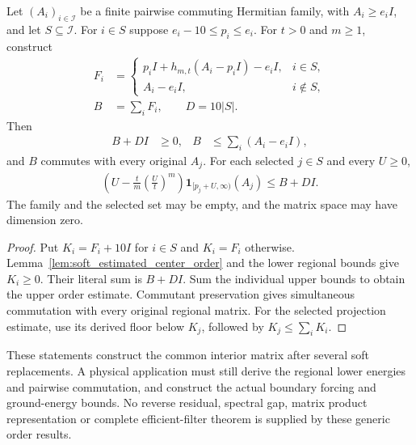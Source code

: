 \begin{lemma}
    \label{lem:soft_commuting_family_order}
    \leanok
    Let $(A_i)_{i\in\mathcal I}$ be a finite pairwise commuting
    Hermitian family, with $A_i\geq e_iI$, and let
    $S\subseteq\mathcal I$. For $i\in S$ suppose
    $e_i-10\leq p_i\leq e_i$. For $t>0$ and $m\geq1$, construct
    \begin{align}
        F_i & =
        \begin{cases}
            p_iI+h_{m,t}(A_i-p_iI)-e_iI, & i\in S,    \\
            A_i-e_iI,                    & i\notin S,
        \end{cases} \\
        B   & =\sum_i F_i,\qquad D=10|S|.
    \end{align}
    Then
    \begin{align}
        B+DI & \geq0, & B & \leq\sum_i(A_i-e_iI),
    \end{align}
    and $B$ commutes with every original $A_j$. For each selected
    $j\in S$ and every $U\geq0$,
    \begin{align}
        \left(U-\frac{t}{m}\left(\frac Ut\right)^m\right)
        \mathbf1_{[p_j+U,\infty)}(A_j)\leq B+DI.
    \end{align}
    The family and the selected set may be empty, and the matrix space
    may have dimension zero.
\end{lemma}
\begin{proof}\leanok
    Put $K_i=F_i+10I$ for $i\in S$ and $K_i=F_i$ otherwise.
    Lemma~\ref{lem:soft_estimated_center_order} and the lower regional
    bounds give $K_i\geq0$. Their literal sum is $B+DI$.
    Sum the individual upper bounds to obtain the upper order estimate.
    Commutant preservation gives simultaneous commutation with every
    original regional matrix. For the selected projection estimate,
    use its derived floor below $K_j$, followed by
    $K_j\leq\sum_iK_i$.
\end{proof}

These statements construct the common interior matrix after several
soft replacements. A physical application must still derive the
regional lower energies and pairwise commutation, and construct the
actual boundary forcing and ground-energy bounds. No reverse residual,
spectral gap, matrix product representation or complete efficient-filter
theorem is supplied by these generic order results.

